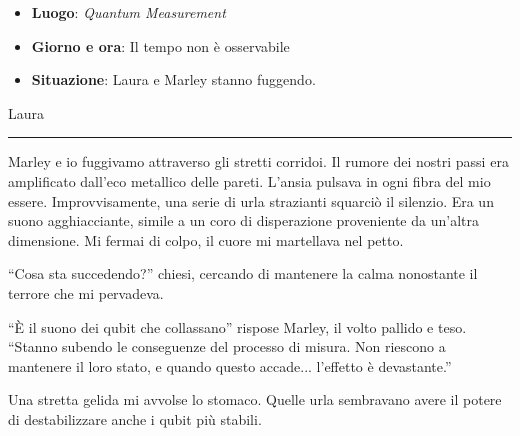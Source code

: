 \begin{tcolorbox}[colback=gray!5,colframe=gray!80,title=\textbf{Scheda Informativa}]
\begin{itemize}
    \item \textbf{Luogo}:  \emph{Quantum Measurement}
    \item \textbf{Giorno e ora}: Il tempo non è osservabile
    \item \textbf{Situazione}: Laura e Marley stanno fuggendo.
\end{itemize}
\end{tcolorbox}

\vspace{1em}
\begin{center}Laura\end{center}
\hrule
\vspace{1em}

 Marley e io fuggivamo attraverso gli stretti corridoi. Il rumore dei nostri passi era amplificato dall'eco metallico delle pareti. L'ansia pulsava in ogni fibra del mio essere. Improvvisamente, una serie di urla strazianti squarciò il silenzio. Era un suono agghiacciante, simile a un coro di disperazione proveniente da un'altra dimensione. Mi fermai di colpo, il cuore mi martellava nel petto.

\begin{dialogue}
 \enquote{Cosa sta succedendo?} chiesi, cercando di mantenere la calma nonostante il terrore che mi pervadeva.

 \enquote{È il suono dei qubit che collassano} rispose Marley, il volto pallido e teso. \enquote{Stanno subendo le conseguenze del processo di misura. Non riescono a mantenere il loro stato, e quando questo accade... l'effetto è devastante.}
\end{dialogue}

Una stretta gelida mi avvolse lo stomaco. Quelle urla sembravano avere il potere di destabilizzare anche i qubit più stabili.

